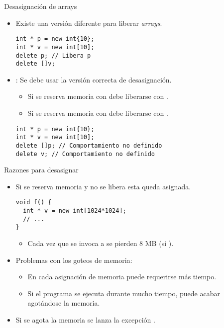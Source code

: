 \begin{frame}[fragile]{Desasignación de arrays}
\begin{itemize}
  \item Existe una versión diferente para liberar \emph{arrays}.
\begin{lstlisting}
int * p = new int{10};
int * v = new int[10];
delete p; // Libera p
delete []v;
\end{lstlisting}

  \vfill\pause
  \item {}: Se debe usar la versión correcta de desasignación.
    \begin{itemize}
      \item Si se reserva memoria con  debe liberarse con .
      \item Si se reserva memoria con  debe liberarse con .
    \end{itemize}
\begin{lstlisting}
int * p = new int{10};
int * v = new int[10];
delete []p; // Comportamiento no definido
delete v; // Comportamiento no definido
\end{lstlisting}
\end{itemize}
\end{frame}

\begin{frame}[fragile]{Razones para desasignar}
\begin{itemize}
  \item Si se reserva memoria y no se libera esta queda asignada.
\begin{lstlisting}
void f() {
  int * v = new int[1024*1024];
  // ...
}
\end{lstlisting}
    \begin{itemize}
      \item Cada vez que se invoca a  se pierden 8 MB (si ).
    \end{itemize}
  \item Problemas con los goteos de memoria:
    \begin{itemize}
      \item En cada asignación de memoria puede requerirse más tiempo.
      \item Si el programa se ejecuta durante mucho tiempo, puede acabar agotándose la memoria.
    \end{itemize}
  \item Si se agota la memoria se lanza la excepción .
\end{itemize}
\end{frame}


